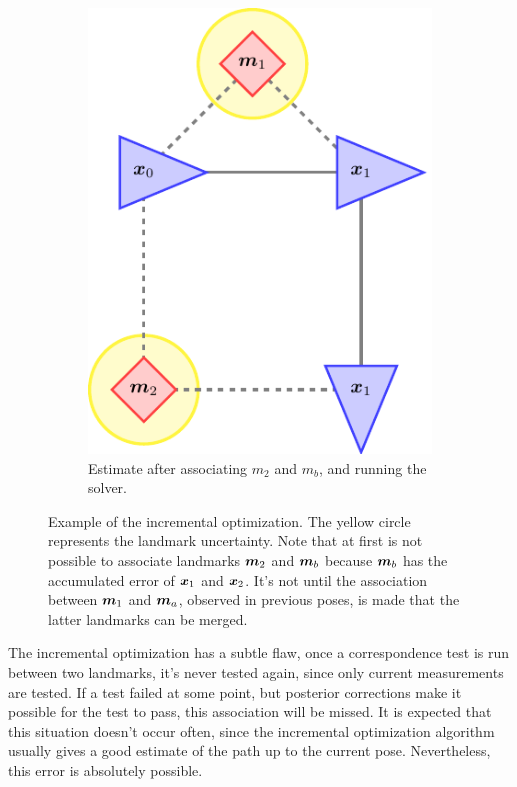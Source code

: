 \begin{figure}[htbp!]
\begin{subfigure}[htbp!]{0.25\textwidth}
        \includegraphics[width=\textwidth]{tikz/incremental3.pdf}
        \caption{Estimate after associating $m_2$ and $m_b$, and running the solver.}
    \end{subfigure}
    \caption[Example of the incremental optimization.]{Example of the incremental optimization. The yellow circle represents the landmark uncertainty. Note that at first is not possible to associate landmarks $\boldsymbol{m}_2$ and $\boldsymbol{m}_b$ because $\boldsymbol{m}_b$ has the accumulated error of $\boldsymbol{x}_1$ and $\boldsymbol{x}_2$. It's not until the association between $\boldsymbol{m}_1$ and $\boldsymbol{m}_a$, observed in previous poses, is made that the latter landmarks can be merged.}
    \label{fig:incremental}
\end{figure}    

The incremental optimization has a subtle flaw, once a correspondence test is run between two landmarks, it's never tested again, since only current measurements are tested. If a test failed at some point, but posterior corrections make it possible for the test to pass, this association will be missed. It is expected that this situation doesn't occur often, since the incremental optimization algorithm usually gives a good estimate of the path up to the current pose. Nevertheless, this error is absolutely possible.

